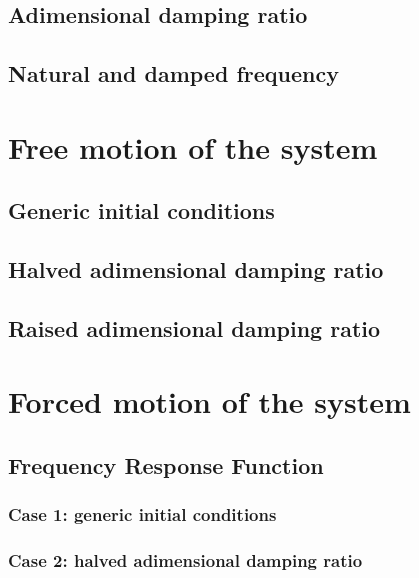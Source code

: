 \documentclass[a4paper,12pt,oneside]{article}
\begin{document}
\subsection{Adimensional damping ratio}



\subsection{Natural and damped frequency}



\section{Free motion of the system}



\subsection{Generic initial conditions}



\subsection{Halved adimensional damping ratio}



\subsection{Raised adimensional damping ratio}



\section{Forced motion of the system}



\subsection{Frequency Response Function}



\subsubsection*{Case 1: generic initial conditions}



\subsubsection*{Case 2: halved adimensional damping ratio}
\end{document}
